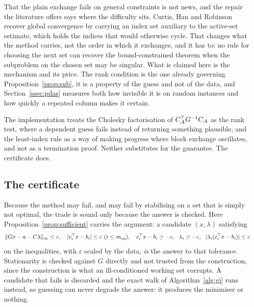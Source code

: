 That the plain exchange fails on general constraints is not news, and the repair
the literature offers says where the difficulty sits. Curtis, Han and
Robinson~\cite{curtis2015pdas} recover global convergence by carrying an index set
auxiliary to the active-set estimate, which holds the indices that would otherwise
cycle. That changes what the method carries, not the order in which it exchanges,
and it has to: no rule for choosing the next set can recover the bound-constrained
theorem when the subproblem on the chosen set may be singular. What is claimed here
is the mechanism and its price. The rank condition is the one already governing
Proposition~\ref{prop:sub}, it is a property of the guess and not of the data, and
Section~\ref{ssec:pdas} measures both how invisible it is on random instances and
how quickly a repeated column makes it certain.

The implementation treats the Cholesky factorisation of
$C_{\mathcal{A}}^{\top} G^{-1}C_{\mathcal{A}}$ as the rank test, where a dependent guess fails
instead of returning something plausible, and the least-index rule as a way of
making progress where block exchange oscillates, and not as a termination proof.
Neither substitutes for the guarantee. The certificate does.

\subsection{The certificate}

Because the method may fail, and may fail by stabilising on a set that is simply not
optimal, the trade is sound only because the answer is checked. Here
Proposition~\ref{prop:sufficient} carries the argument: a candidate
$(x,\lambda)$ satisfying
\begin{equation}
  \lVert G x - a - C\lambda \rVert_\infty \le \varepsilon,
  \quad |c_i^{\top} x - b_i| \le \varepsilon \ (i \le m_{\mathrm{eq}}),
  \quad c_i^{\top} x - b_i \ge -\varepsilon, \ \ \lambda_i \ge -\varepsilon,
  \ \ |\lambda_i (c_i^{\top} x - b_i)| \le \varepsilon
  \label{eq:certificate}
\end{equation}
on the inequalities, with $\varepsilon$ scaled by the data, \emph{is} the answer to
that tolerance.
Stationarity is checked against $G$ directly and not trusted from the
construction, since the construction is what an ill-conditioned working set
corrupts. A candidate that fails is discarded and the exact walk of
Algorithm~\ref{alg:gi} runs instead, so guessing can never degrade the answer: it
produces the minimiser or nothing.


